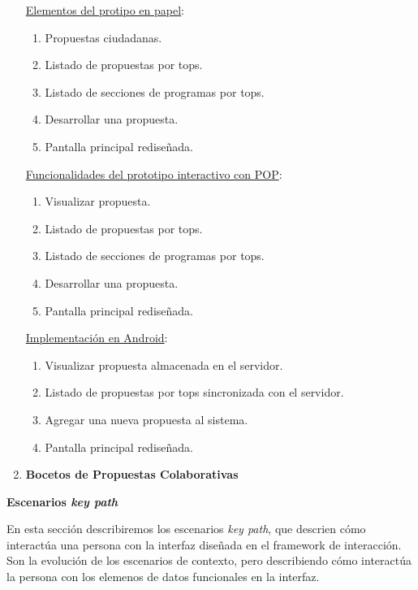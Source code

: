\begin{enumerate}
\underline{Elementos del protipo en papel}:

\begin{enumerate}
 \item Propuestas ciudadanas.
 \item Listado de propuestas por tops.
 \item Listado de secciones de programas por tops.
 \item Desarrollar una propuesta.
 \item Pantalla principal rediseñada.
\end{enumerate}

\underline{Funcionalidades del prototipo interactivo con POP}:

\begin{enumerate}
 \item Visualizar propuesta.
 \item Listado de propuestas por tops.
 \item Listado de secciones de programas por tops.
 \item Desarrollar una propuesta.
 \item Pantalla principal rediseñada.
\end{enumerate}

\underline{Implementación en Android}:

\begin{enumerate}
 \item Visualizar propuesta almacenada en el servidor.
 \item Listado de propuestas por tops sincronizada con el servidor.
 \item Agregar una nueva propuesta al sistema.
 \item Pantalla principal rediseñada.
\end{enumerate}

\item \textbf{Bocetos de Propuestas Colaborativas}

\end{enumerate}

\textbf{Escenarios \textit{key path}}

En esta sección describiremos los escenarios \textit{key path}, que descrien cómo interactúa una persona con la interfaz diseñada en el framework de interacción. Son la evolución de los escenarios de contexto, pero describiendo cómo interactúa la persona con los elemenos de datos funcionales en la interfaz.

